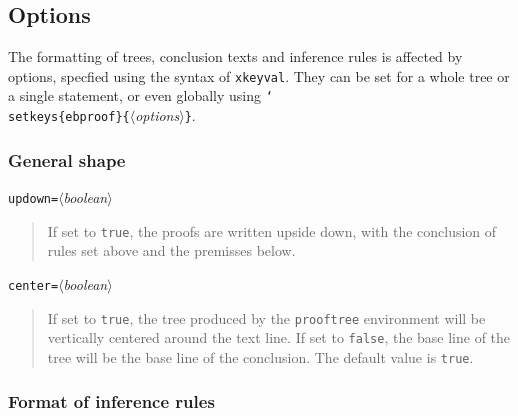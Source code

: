 \documentclass{article}
\DeclareRobustCommand\package[1]{\texttt{#1}}
\newcommand\lit[1]{\texttt{#1}}
\newcommand\cs[1]{\lit{\char`\\#1}}
\newcommand\env[1]{\lit{#1}}
\newcommand\opt[1]{\lit{#1}}
\newcommand\meta[1]{$\langle$\textit{#1}$\rangle$}
\newcommand\marg[1]{\lit{\{}\meta{#1}\lit{\}}}
\newenvironment{csdoc}[1]{%
  \begin{flushleft}#1\end{flushleft}%
  \begin{quote}%
}{%
  \end{quote}%
}
\begin{document}
\subsection{Options}
\label{sec:options}

The formatting of trees, conclusion texts and inference rules is affected by
options, specfied using the syntax of \package{xkeyval}.
They can be set for a whole tree or a single statement, or even globally using
\cs{setkeys}\lit{\{ebproof\}}\marg{options}.

\subsubsection{General shape}

\begin{csdoc}{\opt{updown=}\meta{boolean}}
  If set to \lit{true}, the proofs are written upside down, with the
  conclusion of rules set above and the premisses below.
\end{csdoc}
\begin{csdoc}{\opt{center=}\meta{boolean}}
  If set to \lit{true}, the tree produced by the \env{prooftree} environment
  will be vertically centered around the text line.
  If set to \lit{false}, the base line of the tree will be the base line of
  the conclusion.
  The default value is \lit{true}.
\end{csdoc}

\subsubsection{Format of inference rules}
\end{document}
